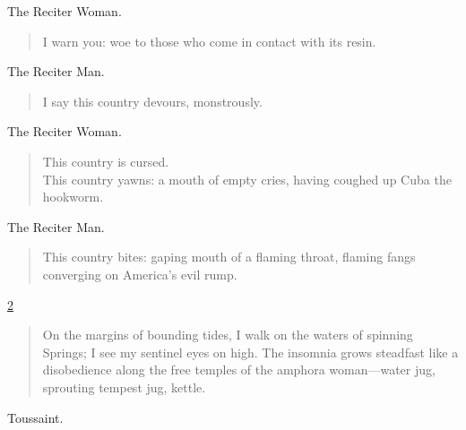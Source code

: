 \documentclass[letterpaper,article,12pt,oneside,notitlepage]{memoir}
\begin{document}
\begin{center}The Reciter Woman.\end{center}

\begin{verse}
I warn you: woe to those who come in contact with its resin. \\
\end{verse}

\begin{center}The Reciter Man.\end{center}

\begin{verse}
I say this country devours, monstrously. \\
\end{verse}

\begin{center}The Reciter Woman.\end{center}

\begin{verse}
This country is cursed. \\
This country yawns: a mouth of empty cries, having coughed up Cuba the hookworm.  \\
\end{verse}

\begin{center}The Reciter Man.\end{center}

\begin{verse}
This country bites: gaping mouth of a flaming throat, flaming fangs converging on America's evil rump. \\
\end{verse}

\clearpage

\href{http://cesaire.elotroalex.com/chiens/chiens/p002.html}{2}

\begin{verse}
\indent On the margins of bounding tides, I walk on the waters of spinning Springs; I see my sentinel eyes on high. The insomnia grows steadfast like a disobedience along the free temples of the amphora woman---water jug, sprouting tempest jug, kettle. \\
\end{verse}

\begin{center}Toussaint.\end{center}
\end{document}

